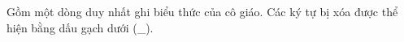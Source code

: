 Gồm một dòng duy nhất ghi biểu thức của cô giáo. Các ký tự bị xóa được thể hiện bằng dấu gạch dưới (\_).